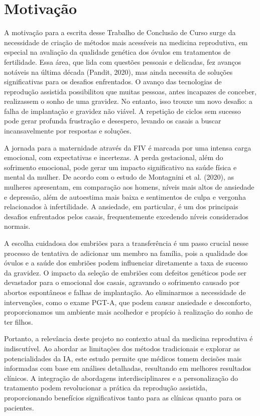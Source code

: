 \section{Motivação}

A motivação para a escrita desse Trabalho de Conclusão de Curso surge da necessidade de criação de métodos mais acessíveis na medicina reprodutiva, em especial na avaliação da qualidade genética dos óvulos em tratamentos de fertilidade. Essa área, que lida com questões pessoais e delicadas, fez avanços notáveis na última década (Pandit, 2020), mas ainda necessita de soluções significativas para os desafios enfrentados. O avanço das tecnologias de reprodução assistida possibilitou que muitas pessoas, antes incapazes de conceber, realizassem o sonho de uma gravidez. No entanto, isso trouxe um novo desafio: a falha de implantação e gravidez não viável. A repetição de ciclos sem sucesso pode gerar profunda frustração e desespero, levando os casais a buscar incansavelmente por respostas e soluções.

A jornada para a maternidade através da FIV é marcada por uma intensa carga emocional, com expectativas e incertezas. A perda gestacional, além do sofrimento emocional, pode gerar um impacto significativo na saúde física e mental da mulher. De acordo com o estudo de Montagnini et al. (2020), as mulheres apresentam, em comparação aos homens, níveis mais altos de ansiedade e depressão, além de autoestima mais baixa e sentimentos de culpa e vergonha relacionados à infertilidade. A ansiedade, em particular, é um dos principais desafios enfrentados pelos casais, frequentemente excedendo níveis considerados normais.

A escolha cuidadosa dos embriões para a transferência é um passo crucial nesse processo de tentativa de adicionar um membro na família, pois a qualidade dos óvulos e a saúde dos embriões podem influenciar diretamente a taxa de sucesso da gravidez. O impacto da seleção de embriões com defeitos genéticos pode ser devastador para o emocional dos casais, agravando o sofrimento causado por abortos espontâneos e falhas de implantação. Ao eliminarmos a necessidade de intervenções, como o exame PGT-A, que podem causar ansiedade e desconforto, proporcionamos um ambiente mais acolhedor e propício à realização do sonho de ter filhos.

Portanto, a relevância deste projeto no contexto atual da medicina reprodutiva é indiscutível. Ao abordar as limitações dos métodos tradicionais e explorar as potencialidades da IA, este estudo permite que médicos tomem decisões mais informadas com base em análises detalhadas, resultando em melhores resultados clínicos. A integração de abordagens interdisciplinares e a personalização do tratamento podem revolucionar a prática da reprodução assistida, proporcionando benefícios significativos tanto para as clínicas quanto para os pacientes.


